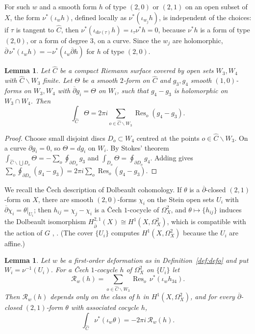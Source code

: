 \documentclass[11pt]{amsart}
\newtheorem{lemma}[theorem]{Lemma}
\theoremstyle{definition}
\theoremstyle{remark}
\numberwithin{equation}{section}
\newcommand{\cR}{\mathcal{R}}
\newcommand{\Res}{\mathop{\mathrm{Res}}\nolimits}
\newcommand{\Ob}{\overline{\partial}}
\newcommand{\sm}{\smallsetminus}
\begin{document}
For such $w$ and a smooth form $h$ of type $(2,0)$ or $(2,1)$ on an open subset of $X$, the form $\nu^*(\iota_wh)$, defined locally as $\nu^*(\iota_{w_j}h)$, is independent of the choices: if $\tau$ is tangent to $\widehat C$, then $\nu^*(\iota_{d\nu(\tau)}h)=\iota_\tau\nu^*h=0$, because $\nu^*h$ is a form of type $(2,0)$, or a form of degree $3$, on a curve. Since the $w_j$ are holomorphic, $\Ob\,\nu^*(\iota_wh)=-\nu^*(\iota_w\Ob h)$ for $h$ of type $(2,0)$.

\begin{lemma}\label{lem:trace}
Let $\widehat C$ be a compact Riemann surface covered by open sets $W_3,W_4$ with $\widehat C\sm W_3$ finite. Let $\Theta$ be a smooth $2$-form on $\widehat C$ and $g_3,g_4$ smooth $(1,0)$-forms on $W_3,W_4$ with $\Ob g_i=\Theta$ on $W_i$, such that $g_4-g_3$ is holomorphic on $W_3\cap W_4$. Then
\[
\int_{\widehat C}\Theta=2\pi i\sum_{o\in\widehat C\sm W_3}\Res_o(g_4-g_3).
\]
\end{lemma}

\begin{proof}
Choose small disjoint discs $D_o\subset W_4$ centred at the points $o\in\widehat C\sm W_3$. On a curve $\partial g_i=0$, so $\Theta=dg_i$ on $W_i$. By Stokes' theorem $\int_{\widehat C\sm\bigcup D_o}\Theta=-\sum_o\oint_{\partial D_o}g_3$ and $\int_{D_o}\Theta=\oint_{\partial D_o}g_4$. Adding gives $\sum_o\oint_{\partial D_o}(g_4-g_3)=2\pi i\sum_o\Res_o(g_4-g_3)$.
\end{proof}

We recall the \v{C}ech description of Dolbeault cohomology. If $\theta$ is a $\Ob$-closed $(2,1)$-form on $X$, there are smooth $(2,0)$-forms $\chi_i$ on the Stein open sets $U_i$ with $\Ob\chi_i=\theta|_{U_i}$; then $h_{ij}=\chi_j-\chi_i$ is a \v{C}ech $1$-cocycle of $\Omega^2_X$, and $\theta\mapsto\{h_{ij}\}$ induces the Dolbeault isomorphism $H^{2,1}_{\Ob}(X)\cong H^1(X,\Omega^2_X)$, which is compatible with the action of $G$ \cite[Chapter~0, Section~3]{GH78}, \cite[Ch.~4]{Vo02}. (The cover $\{U_i\}$ computes $H^1(X,\Omega^2_X)$ because the $U_i$ are affine.)

\begin{lemma}\label{lem:R}
Let $w$ be a first-order deformation as in Definition~\ref{def:defo} and put $W_i=\nu^{-1}(U_i)$. For a \v{C}ech $1$-cocycle $h$ of $\Omega^2_X$ on $\{U_i\}$ let
\[
\cR_w(h)=\sum_{o\in\widehat C\sm W_3}\Res_o\,\nu^*(\iota_wh_{34}).
\]
Then $\cR_w(h)$ depends only on the class of $h$ in $H^1(X,\Omega^2_X)$, and for every $\Ob$-closed $(2,1)$-form $\theta$ with associated cocycle $h$,
\[
\int_{\widehat C}\nu^*(\iota_w\theta)=-2\pi i\,\cR_w(h).
\]
\end{lemma}
\end{document}
